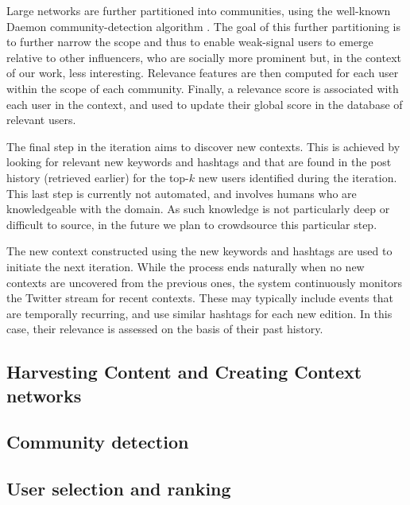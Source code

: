 \documentclass[runningheads]{llncs}
\begin{document}
Large networks are further partitioned into communities, using the well-known Daemon community-detection algorithm \cite{DEMON}.
%
The goal of this further partitioning is to further narrow the scope and thus to enable weak-signal users to emerge relative to other influencers, who are socially more prominent but, in the context of our work, less interesting.
Relevance features are then computed for each user within the scope of each community. 
Finally, a relevance score is associated with each user in the context, and used to update their global score in the database of relevant users.

The final step in the iteration aims to discover new contexts. 
This is achieved by looking for relevant new keywords and hashtags and that are found in the post history (retrieved earlier) for the top-$k$ new users identified during the iteration. 
This last step is currently not automated, and involves humans who are knowledgeable with the domain. 
As such knowledge is not particularly deep or difficult to source, in the future we plan to crowdsource this particular step.

The new context constructed using the new keywords and hashtags are used to initiate the next iteration. 
While the process ends naturally when no new contexts are uncovered from the previous ones, the system continuously monitors the Twitter stream for recent contexts. These may typically include events that are temporally recurring, and use similar hashtags for each new edition. In this case, their relevance is assessed on the basis of their past history.


\subsection{Harvesting Content and Creating Context networks}   \label{sec:harvesting}


\subsection{Community detection}   \label{sec:communities}


\subsection{User selection and ranking}   \label{sec:communities}
\end{document}
